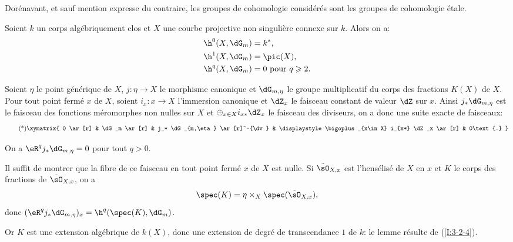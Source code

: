 Dorénavant, et sauf mention expresse du contraire, les groupes de 
cohomologie considérés sont les groupes de cohomologie étale. 





\begin{propositiondotdash}\label{I:3-3-1}
Soient $k$ un corps algébriquement clos et $X$ une courbe projective non 
singulière connexe sur $k$. Alors on a:
\begin{align*}
  \h^0(X,\dG_m) &= k^* \text{,} \\
  \h^1(X,\dG_m) &= \pic(X) \text{,} \\
  \h^q(X,\dG_m) &= 0 \text{ pour $q\geqslant 2$.}
\end{align*}
\end{propositiondotdash}

Soient $\eta$ le point générique de $X$, $j:\eta\to X$ le morphisme 
canonique et $\dG_{m,\eta}$ le groupe multiplicatif du corps des fractions 
$K(X)$ de $X$. Pour tout point fermé $x$ de $X$, soient $i_x:x\to X$ l'immersion 
canonique et $\dZ_x$ le faisceau constant de valeur $\dZ$ sur $x$. Ainsi 
$j_*\dG_{m,\eta}$ est le faisceau des fonctions méromorphes non nulles sur 
$X$ et $\oplus_{x\in X} i_{x*}\dZ_x$ le faisceau des diviseurs, on a donc une 
suite exacte de faisceaux:
\begin{equation*}\tag{*}\label{I:eq:3-3-1-1}
\xymatrix{
  0 \ar[r] 
    & \dG_m \ar[r]
    & j_* \dG_{m,\eta} \ar[r]^-{\dv} 
    & \displaystyle\bigoplus_{x\in X} i_{x*} \dZ_x \ar[r] 
    & 0\text{.}
}
\end{equation*}





\begin{lemmadotdash}\label{I:3-3-2}
On a $\eR^q j_* \dG_{m,\eta} = 0$ pour tout $q>0$.
\end{lemmadotdash}

Il suffit de montrer que la fibre de ce faisceau en tout point fermé $x$ 
de $X$ est nulle. Si $\tilde\sO_{X,x}$ est l'hensélisé de $X$ en $x$ et $K$ 
le corps des fractions de $\tilde\sO_{X,x}$, on a 
\[
  \spec(K) = \eta\times_X \spec(\tilde\sO_{X,x})\text{,}
\]
donc $(\eR^qj_*\dG_{m,\eta})_x = \h^q(\spec(K),\dG_m)$. 

Or $K$ est une extension algébrique de $k(X)$, donc une extension de degré 
de transcendance $1$ de $k$: le lemme résulte de (\ref{I:3-2-4}). 





